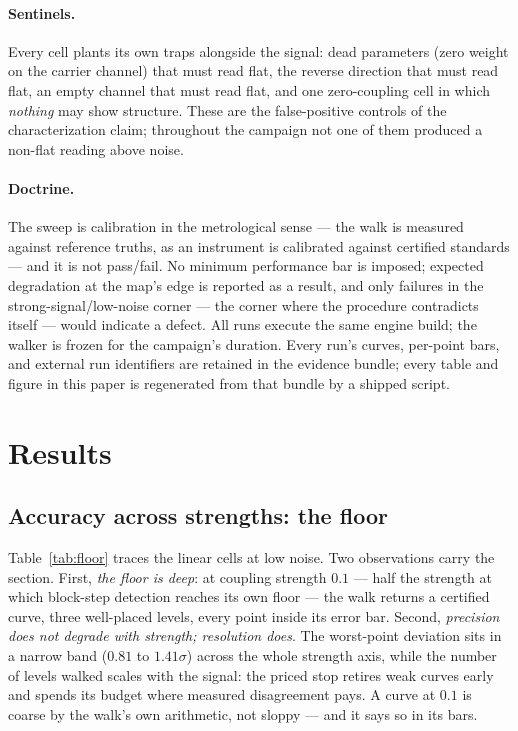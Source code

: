\documentclass[11pt,a4paper]{article}
\begin{document}
\paragraph{Sentinels.}
Every cell plants its own traps alongside the signal: dead parameters
(zero weight on the carrier channel) that must read flat, the reverse
direction that must read flat, an empty channel that must read flat,
and one zero-coupling cell in which \emph{nothing} may show
structure. These are the false-positive controls of the
characterization claim; throughout the campaign not one of them
produced a non-flat reading above noise.

\paragraph{Doctrine.}
The sweep is calibration in the metrological sense --- the walk is
measured against reference truths, as an instrument is calibrated
against certified standards --- and it is not pass/fail. No minimum performance bar is
imposed; expected degradation at the map's edge is reported as a
result, and only failures in the strong-signal/low-noise corner ---
the corner where the procedure contradicts itself --- would indicate
a defect. All runs execute the same engine build; the walker is
frozen for the campaign's duration. Every run's curves, per-point
bars, and external run identifiers are retained in the evidence
bundle; every table and figure in this paper is regenerated from that
bundle by a shipped script.

\section{Results}
\label{sec:results}

\subsection{Accuracy across strengths: the floor}
\label{sec:floor}

Table~\ref{tab:floor} traces the linear cells at low noise. Two
observations carry the section. First, \emph{the floor is deep}: at
coupling strength $0.1$ --- half the strength at which block-step
detection reaches its own floor --- the walk returns a certified
curve, three well-placed levels, every point inside its error bar.
Second, \emph{precision does not degrade with strength; resolution
does}. The worst-point deviation sits in a narrow band ($0.81$ to
$1.41\sigma$) across the whole strength axis, while the number of
levels walked scales with the signal: the priced stop retires weak
curves early and spends its budget where measured disagreement pays.
A curve at $0.1$ is coarse by the walk's own arithmetic, not
sloppy --- and it says so in its bars.
\end{document}
